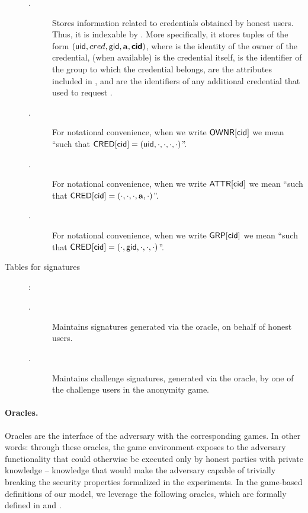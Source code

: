 \begin{description}
  \begin{description}
  \item[\CRED.] Stores information related to credentials obtained by honest
    users. Thus, it is indexable by \cid. More specifically, it stores tuples of
    the form $(\mathsf{uid},cred,\mathsf{gid},\mathbf{a},\boldsymbol{\mathsf{cid}})$, where \uid is the identity of the
    owner of the credential, \cred (when available) is the credential itself,
    \gid is the identifier of the group to which the credential belongs, \attrs
    are the attributes included in \cred, and \scid are the identifiers of any
    additional credential that \uid used to request \cred.
  \item[\OWNR.] For notational convenience, when we write $\mathsf{OWNR}[\mathsf{cid}]$ we mean
    ``\uid such that $\mathsf{CRED}[\mathsf{cid}] = (\mathsf{uid}, \cdot, \cdot, \cdot, \cdot)$''.
  \item[\ATTR.] For notational convenience, when we write $\mathsf{ATTR}[\mathsf{cid}]$ we mean
    ``\attrs such that $\mathsf{CRED}[\mathsf{cid}] = (\cdot, \cdot, \cdot, \mathbf{a}, \cdot)$''.
  \item[\GRP.] For notational convenience, when we write $\mathsf{GRP}[\mathsf{cid}]$ we mean
    ``\gid such that $\mathsf{CRED}[\mathsf{cid}] = (\cdot, \mathsf{gid}, \cdot, \cdot, \cdot)$''.
  \end{description}
\item[Tables for signatures]:
  \begin{description}
  \item[\SIG.] Maintains signatures generated via the \SIGN oracle, on behalf
    of honest users.
  \item[\CSIG.] Maintains challenge signatures, generated via the \CHALb oracle,
    by one of the challenge users in the anonymity game.
  \end{description}
\end{description}

\paragraph{Oracles.} %
Oracles are the interface of the adversary with the corresponding games. In
other words: through these oracles, the game environment exposes to the adversary
functionality that could otherwise be executed only by honest parties with
private knowledge -- knowledge that would make the adversary capable of
trivially breaking the security properties formalized in the experiments.
In the game-based definitions of our \UAS model, we leverage the following
oracles, which are formally defined in  and
. 

